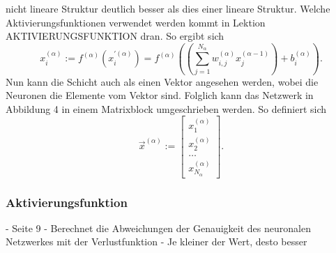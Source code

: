\documentclass[11pt]{article}
\begin{document}
nicht lineare Struktur deutlich besser als dies einer lineare Struktur. Welche Aktivierungsfunktionen verwendet werden kommt in Lektion AKTIVIERUNGSFUNKTION
dran. So ergibt sich
\begin{equation}
    x_{i}^{(\alpha)} := f^{(\alpha)}(x_{i}^{'(\alpha)}) = f^{(\alpha)}((\sum_{j=1}^{N_{\alpha}} w_{i,j}^{(\alpha)} x_{j}^{(\alpha-1)}) + b_{i}^{(\alpha)}).
\end{equation}
Nun kann die Schicht auch als einen Vektor angesehen werden, wobei die Neuronen die Elemente vom Vektor sind. Folglich kann das Netzwerk
in Abbildung 4 in einem Matrixblock umgeschrieben werden. So definiert sich
\begin{equation}
    \vec{x}^{(\alpha)} := \begin{bmatrix}x_{1}^{(\alpha)} \\ x_{2    }^{(\alpha)} \\ \ldots \\ x_{N_{\alpha}}^{(\alpha)} \end{bmatrix}.
\end{equation}



\subsubsection{Aktivierungsfunktion}
- Seite 9
- Berechnet die Abweichungen der Genauigkeit des neuronalen Netzwerkes mit der Verlustfunktion
- Je kleiner der Wert, desto besser
\end{document}
